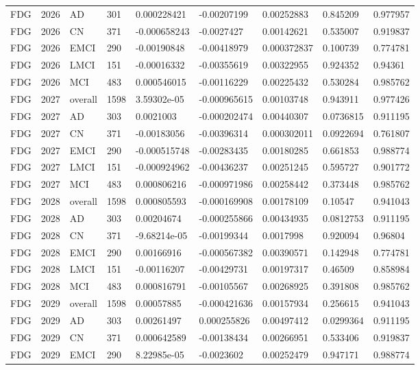\begin{landscape}
\begin{longtable}{lllllllll}
FDG & 2026 & AD & 301 & 0.000228421 & -0.00207199 & 0.00252883 & 0.845209 & 0.977957 \\
FDG & 2026 & CN & 371 & -0.000658243 & -0.0027427 & 0.00142621 & 0.535007 & 0.919837 \\
FDG & 2026 & EMCI & 290 & -0.00190848 & -0.00418979 & 0.000372837 & 0.100739 & 0.774781 \\
FDG & 2026 & LMCI & 151 & -0.00016332 & -0.00355619 & 0.00322955 & 0.924352 & 0.94361 \\
FDG & 2026 & MCI & 483 & 0.000546015 & -0.00116229 & 0.00225432 & 0.530284 & 0.985762 \\
FDG & 2027 & overall & 1598 & 3.59302e-05 & -0.000965615 & 0.00103748 & 0.943911 & 0.977426 \\
FDG & 2027 & AD & 303 & 0.0021003 & -0.000202474 & 0.00440307 & 0.0736815 & 0.911195 \\
FDG & 2027 & CN & 371 & -0.00183056 & -0.00396314 & 0.000302011 & 0.0922694 & 0.761807 \\
FDG & 2027 & EMCI & 290 & -0.000515748 & -0.00283435 & 0.00180285 & 0.661853 & 0.988774 \\
FDG & 2027 & LMCI & 151 & -0.000924962 & -0.00436237 & 0.00251245 & 0.595727 & 0.901772 \\
FDG & 2027 & MCI & 483 & 0.000806216 & -0.000971986 & 0.00258442 & 0.373448 & 0.985762 \\
FDG & 2028 & overall & 1598 & 0.000805593 & -0.000169908 & 0.00178109 & 0.10547 & 0.941043 \\
FDG & 2028 & AD & 303 & 0.00204674 & -0.000255866 & 0.00434935 & 0.0812753 & 0.911195 \\
FDG & 2028 & CN & 371 & -9.68214e-05 & -0.00199344 & 0.0017998 & 0.920094 & 0.96804 \\
FDG & 2028 & EMCI & 290 & 0.00166916 & -0.000567382 & 0.00390571 & 0.142948 & 0.774781 \\
FDG & 2028 & LMCI & 151 & -0.00116207 & -0.00429731 & 0.00197317 & 0.46509 & 0.858984 \\
FDG & 2028 & MCI & 483 & 0.000816791 & -0.00105567 & 0.00268925 & 0.391808 & 0.985762 \\
FDG & 2029 & overall & 1598 & 0.00057885 & -0.000421636 & 0.00157934 & 0.256615 & 0.941043 \\
FDG & 2029 & AD & 303 & 0.00261497 & 0.000255826 & 0.00497412 & 0.0299364 & 0.911195 \\
FDG & 2029 & CN & 371 & 0.000642589 & -0.00138434 & 0.00266951 & 0.533406 & 0.919837 \\
FDG & 2029 & EMCI & 290 & 8.22985e-05 & -0.0023602 & 0.00252479 & 0.947171 & 0.988774 \\

\end{longtable}
\end{landscape}

